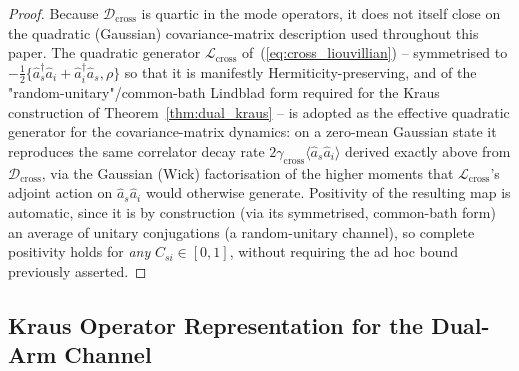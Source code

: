 \documentclass[journal]{IEEEtran}
\begin{document}
\begin{proof}
Because $\mathcal D_{\text{cross}}$ is quartic in the mode operators, it does not itself close on the quadratic (Gaussian) covariance-matrix description used throughout this paper. The quadratic generator $\mathcal L_{\text{cross}}$ of~(\ref{eq:cross_liouvillian}) -- symmetrised to $-\tfrac12\{\hat a_s^\dagger\hat a_i+\hat a_i^\dagger\hat a_s,\rho\}$ so that it is manifestly Hermiticity-preserving, and of the "random-unitary"/common-bath Lindblad form required for the Kraus construction of Theorem~\ref{thm:dual_kraus} -- is adopted as the effective quadratic generator for the covariance-matrix dynamics: on a zero-mean Gaussian state it reproduces the same correlator decay rate $2\gamma_{\text{cross}}\langle\hat a_s\hat a_i\rangle$ derived exactly above from $\mathcal D_{\text{cross}}$, via the Gaussian (Wick) factorisation of the higher moments that $\mathcal L_{\text{cross}}$'s adjoint action on $\hat a_s\hat a_i$ would otherwise generate. Positivity of the resulting map is automatic, since it is by construction (via its symmetrised, common-bath form) an average of unitary conjugations (a random-unitary channel), so complete positivity holds for \emph{any} $C_{si}\in[0,1]$, without requiring the ad hoc bound previously asserted.
\end{proof}

\subsection{Kraus Operator Representation for the Dual-Arm Channel}
\end{document}
